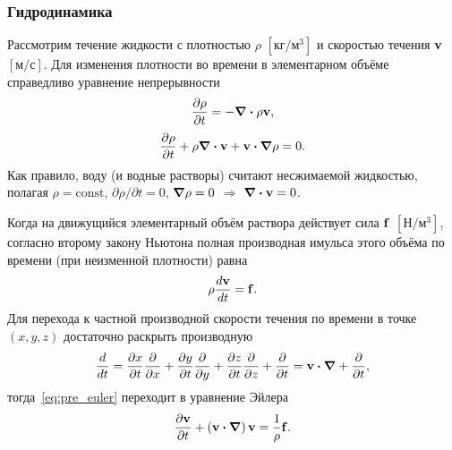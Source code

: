 \documentclass[oneside,final,12pt]{extreport}
\newcommand\const[0]{\text{const}}
\newcommand\bcdot[0]{\boldsymbol\cdot}
\newcommand\bnabla[0]{\boldsymbol\nabla}
\begin{document}
\subsubsection*{Гидродинамика}
Рассмотрим течение жидкости с плотностью
$\rho$ $\left[\text{кг}/\text{м}^3\right]$
и скоростью течения $\vb v$ $\left[\text{м}/\text{с}\right]$.
Для изменения плотности во времени в элементарном объёме справедливо уравнение непрерывности
\begin{equation}
  \frac{\partial\rho}{\partial t} = - \div \rho \vb v,
\end{equation}
\begin{equation}
  \frac{\partial\rho}{\partial t} + \rho \div \vb v + \vb v \bcdot \grad \rho = 0.
\end{equation}
Как правило, воду (и водные растворы) считают несжимаемой жидкостью, полагая
$\rho = \const$, $\partial\rho / \partial t = 0$, $\grad \rho = 0$ $\Rightarrow$ $\div \vb v = 0$.

Когда на движущийся элементарный объём раствора действует сила
$\vb f$ $\left[\text{Н}/\text{м}^3\right]$,
согласно второму закону Ньютона полная производная имульса этого объёма по времени
(при неизменной плотности) равна
\begin{equation}
  \rho\frac{d \vb v}{d t} = \vb f.
\label{eq:pre_euler}
\end{equation}
Для перехода к частной производной скорости течения по времени в точке
$\left(x, y, z\right)$ достаточно раскрыть производную
\begin{equation}
  \frac{d}{dt} = \frac{\partial x}{\partial t}\frac{\partial}{\partial x} +
                 \frac{\partial y}{\partial t}\frac{\partial}{\partial y} +
                 \frac{\partial z}{\partial t}\frac{\partial}{\partial z} +
                 \frac{\partial}{\partial t}
               = \vb v \bcdot \bnabla + \frac{\partial}{\partial t},
\end{equation}
тогда~\eqref{eq:pre_euler} переходит в уравнение Эйлера
\begin{equation}
  \frac{\partial \vb v}{\partial t} + \left(\vb v \bcdot \bnabla\right) \vb v = \frac{1}{\rho} \vb f.
\label{eq:euler}
\end{equation}
\end{document}
